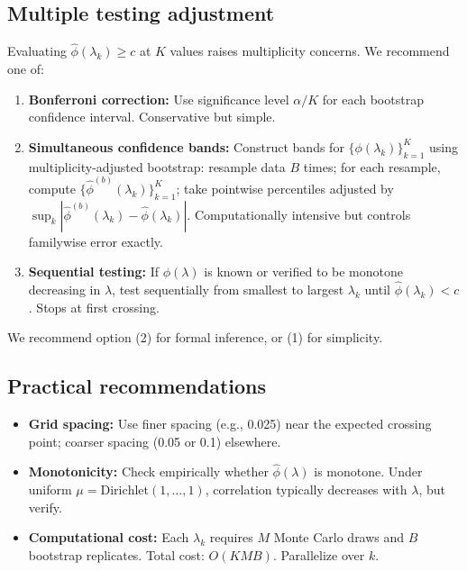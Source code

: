 \documentclass{article}
\begin{document}
\subsection{Multiple testing adjustment}

Evaluating $\hat{\phi}(\lambda_k) \geq c$ at $K$ values raises multiplicity concerns.
We recommend one of:

\begin{enumerate}
    \item \textbf{Bonferroni correction:} Use significance level $\alpha/K$ for
          each bootstrap confidence interval. Conservative but simple.

    \item \textbf{Simultaneous confidence bands:} Construct bands for
          $\{\phi(\lambda_k)\}_{k=1}^K$ using multiplicity-adjusted bootstrap:
          resample data $B$ times; for each resample, compute $\{\hat{\phi}^{(b)}(\lambda_k)\}_{k=1}^K$;
          take pointwise percentiles adjusted by $\sup_{k} |\hat{\phi}^{(b)}(\lambda_k) - \hat{\phi}(\lambda_k)|$.
          Computationally intensive but controls familywise error exactly.

    \item \textbf{Sequential testing:} If $\phi(\lambda)$ is known or verified to be
          monotone decreasing in $\lambda$, test sequentially from smallest to largest
          $\lambda_k$ until $\hat{\phi}(\lambda_k) < c$. Stops at first crossing.
\end{enumerate}

We recommend option (2) for formal inference, or (1) for simplicity.

\subsection{Practical recommendations}

\begin{itemize}
    \item \textbf{Grid spacing:} Use finer spacing (e.g., 0.025) near the expected
          crossing point; coarser spacing (0.05 or 0.1) elsewhere.
    \item \textbf{Monotonicity:} Check empirically whether $\hat{\phi}(\lambda)$
          is monotone. Under uniform $\mu = \text{Dirichlet}(1,\ldots,1)$,
          correlation typically decreases with $\lambda$, but verify.
    \item \textbf{Computational cost:} Each $\lambda_k$ requires $M$ Monte Carlo
          draws and $B$ bootstrap replicates. Total cost: $O(KMB)$. Parallelize
          over $k$.
\end{itemize}
\end{document}
